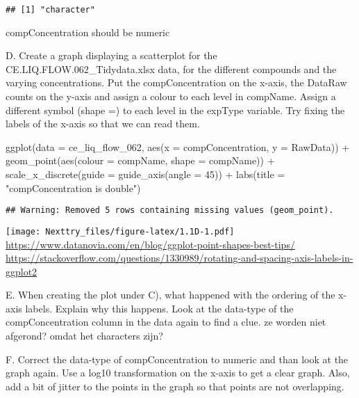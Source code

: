 \documentclass[
]{book}
\newenvironment{Shaded}{\begin{snugshade}}{\end{snugshade}}
\newcommand{\AttributeTok}[1]{\textcolor[rgb]{0.77,0.63,0.00}{#1}}
\newcommand{\DecValTok}[1]{\textcolor[rgb]{0.00,0.00,0.81}{#1}}
\newcommand{\FunctionTok}[1]{\textcolor[rgb]{0.00,0.00,0.00}{#1}}
\newcommand{\NormalTok}[1]{#1}
\newcommand{\SpecialCharTok}[1]{\textcolor[rgb]{0.00,0.00,0.00}{#1}}
\newcommand{\StringTok}[1]{\textcolor[rgb]{0.31,0.60,0.02}{#1}}
\begin{document}
\begin{verbatim}
## [1] "character"
\end{verbatim}

compConcentration should be numeric

D. Create a graph displaying a scatterplot for the CE.LIQ.FLOW.062\_Tidydata.xlsx data, for the different compounds and the varying concentrations. Put the compConcentration on the x-axis, the DataRaw counts on the y-axis and assign a colour to each level in compName. Assign a different symbol (shape =) to each level in the expType variable. Try fixing the labels of the x-axis so that we can read them.

\begin{Shaded}
\begin{Highlighting}[]
\FunctionTok{ggplot}\NormalTok{(}\AttributeTok{data =}\NormalTok{ ce\_liq\_flow\_062, }\FunctionTok{aes}\NormalTok{(}\AttributeTok{x =}\NormalTok{ compConcentration, }\AttributeTok{y =}\NormalTok{ RawData)) }\SpecialCharTok{+}
  \FunctionTok{geom\_point}\NormalTok{(}\FunctionTok{aes}\NormalTok{(}\AttributeTok{colour =}\NormalTok{ compName, }\AttributeTok{shape =}\NormalTok{ compName)) }\SpecialCharTok{+}
   \FunctionTok{scale\_x\_discrete}\NormalTok{(}\AttributeTok{guide =} \FunctionTok{guide\_axis}\NormalTok{(}\AttributeTok{angle =} \DecValTok{45}\NormalTok{)) }\SpecialCharTok{+}
  \FunctionTok{labs}\NormalTok{(}\AttributeTok{title =} \StringTok{"compConcentration is double"}\NormalTok{)}
\end{Highlighting}
\end{Shaded}

\begin{verbatim}
## Warning: Removed 5 rows containing missing values (geom_point).
\end{verbatim}

\texttt{[image: Nexttry\_files/figure-latex/1.1D-1.pdf]}
\url{https://www.datanovia.com/en/blog/ggplot-point-shapes-best-tips/}
\url{https://stackoverflow.com/questions/1330989/rotating-and-spacing-axis-labels-in-ggplot2}

E. When creating the plot under C), what happened with the ordering of the x-axis labels. Explain why this happens. Look at the data-type of the compConcentration column in the data again to find a clue.
ze worden niet afgerond? omdat het characters zijn?

F. Correct the data-type of compConcentration to numeric and than look at the graph again. Use a log10 transformation on the x-axis to get a clear graph. Also, add a bit of jitter to the points in the graph so that points are not overlapping.
\end{document}
